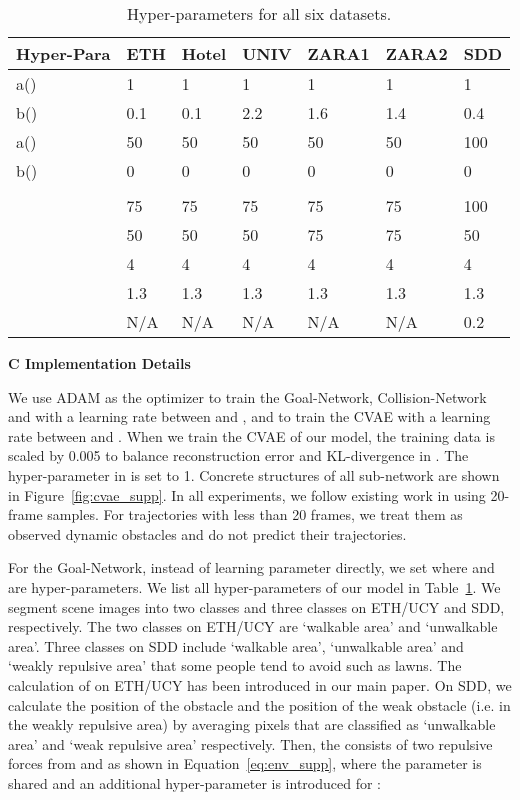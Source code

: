 \documentclass[runningheads]{llncs}
\newcommand{\Figref}[1]{Figure~\ref{fig:#1}}
\newcommand{\Eqnref}[1]{Equation~\ref{eq:#1}}
\newcommand{\Tabref}[1]{Table~\ref{tab:#1}}
\begin{document}
\begin{table}[t]
\begin{center}
\caption{Hyper-parameters for all six datasets.}
\begin{tabular}{ |p{1.8cm}||p{1.3cm}|p{1.3cm}|p{1.3cm}|p{1.3cm}|p{1.3cm}|p{1.3cm}|}
 \hline
 Hyper-Para & ETH & Hotel & UNIV & ZARA1 & ZARA2 & SDD \\
 \hline
 a() & 1 & 1 & 1 & 1 & 1 & 1 \\
 \hline
 b() & 0.1 & 0.1 & 2.2 & 1.6 & 1.4 & 0.4 \\
 \hline
 a() & 50 & 50 & 50 & 50 & 50 & 100 \\
 \hline
 b() & 0 & 0 & 0 & 0 & 0 & 0 \\
 \hline
 &  &  &  &  &  & \\
 \hline
  & 75 & 75 & 75 & 75 & 75 & 100 \\
 \hline
  & 50 & 50 & 50 & 75 & 75 & 50 \\
 \hline
  & 4 & 4 & 4 & 4 & 4 & 4 \\
 \hline
  & 1.3 & 1.3 & 1.3 & 1.3 & 1.3 & 1.3 \\
 \hline 
  & N/A & N/A & N/A & N/A & N/A & 0.2 \\
 \hline
 
\end{tabular}

\label{tab:hyperp_supp}
\end{center}
\end{table}

\vspace{15pt}
\noindent
\textbf{\large C Implementation Details}
\vspace{15pt}

\noindent
We use ADAM as the optimizer to train the Goal-Network, Collision-Network and  with a learning rate between  and , and to train the CVAE with a learning rate between  and . When we train the CVAE of our model, the training data is scaled by 0.005 to balance reconstruction error and KL-divergence in . The hyper-parameter  in  is set to 1. Concrete structures of all sub-network are shown in \Figref{cvae_supp}. In all experiments, we follow existing work in using 20-frame samples. For trajectories with less than 20 frames, we treat them as observed dynamic obstacles and do not predict their trajectories. 

For the Goal-Network, instead of learning parameter  directly, we set  where  and  are hyper-parameters. We list all hyper-parameters of our model in \Tabref{hyperp_supp}. We segment scene images into two classes and three classes on ETH/UCY and SDD, respectively. The two classes on ETH/UCY are `walkable area' and `unwalkable area'. Three classes on SDD include `walkable area', `unwalkable area' and `weakly repulsive area' that some people tend to avoid such as lawns. The calculation of  on ETH/UCY has been introduced in our main paper. On SDD, we calculate the position of the obstacle  and the position of the weak obstacle  (i.e. in the weakly repulsive area) by averaging pixels that are classified as `unwalkable area' and `weak repulsive area' respectively. Then, the  consists of two repulsive forces from   and  as shown in \Eqnref{env_supp}, where the parameter  is shared and an additional hyper-parameter  is introduced for :
\end{document}
